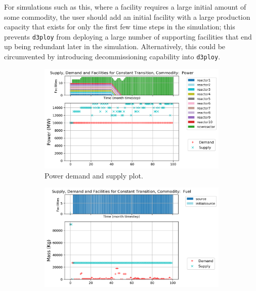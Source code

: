 \documentclass[11pt,letterpaper]{article}
\newcommand{\deploy}{\texttt{d3ploy}\xspace}%
\begin{document}
For simulations such as this, where a facility requires a large initial amount of some
commodity, the user should add an initial
facility with a large production capacity that exists for only the first few time steps
in the simulation; this prevents \deploy from deploying a large number
of supporting facilities that end up being redundant later in
the simulation.
Alternatively, this could be circumvented by introducing decommissioning 
capability into \deploy.  

\begin{figure}[!htbp]
    \centering
    \begin{subfigure}[t]{\textwidth}
    \centering
        \includegraphics[width=\linewidth]{figures/constanttransition-power.png} 
        \caption{Power demand and supply plot.}
        \label{fig:constanttransition-power}
    \end{subfigure}
    \vspace{1cm}
    \begin{subfigure}[t]{0.45\textwidth}
        \centering
        \includegraphics[width=\linewidth]{figures/constanttransition-fuel.png} 

\end{subfigure}
\end{figure}
\end{document}
